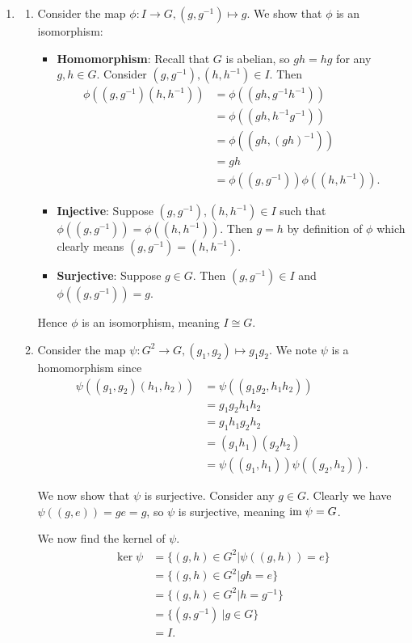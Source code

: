 \begin{enumerate}
    \item \begin{enumerate}[label=(\roman*)]
        \item Consider the map $\phi: I \to G, (g, g^{-1}) \mapsto g$. We show that $\phi$ is an isomorphism:
        \begin{itemize}
            \item \textbf{Homomorphism}: Recall that $G$ is abelian, so $gh = hg$ for any $g, h \in G$. Consider $(g, g^{-1}), (h, h^{-1}) \in I$. Then
            \begin{align*}
                \phi((g, g^{-1})(h, h^{-1})) &= \phi((gh, g^{-1}h^{-1}))\\
                &= \phi((gh, h^{-1}g^{-1}))\\
                &= \phi((gh, (gh)^{-1}))\\
                &= gh\\
                &= \phi((g, g^{-1}))\phi((h, h^{-1})).
            \end{align*}
            \item \textbf{Injective}: Suppose $(g, g^{-1}), (h, h^{-1}) \in I$ such that $\phi((g, g^{-1})) = \phi((h, h^{-1}))$. Then $g = h$ by definition of $\phi$ which clearly means $(g, g^{-1}) = (h, h^{-1})$.
            \item \textbf{Surjective}: Suppose $g \in G$. Then $(g, g^{-1}) \in I$ and $\phi((g, g^{-1})) = g$.
        \end{itemize}
        Hence $\phi$ is an isomorphism, meaning $I \cong G$.
        
        \item Consider the map $\psi: G^2 \to G, (g_1, g_2) \mapsto g_1g_2$. We note $\psi$ is a homomorphism since
        \begin{align*}
            \psi((g_1, g_2)(h_1, h_2)) &= \psi((g_1g_2, h_1h_2))\\
            &= g_1g_2h_1h_2\\
            &= g_1h_1g_2h_2\\
            &= (g_1h_1)(g_2h_2)\\
            &= \psi((g_1, h_1))\psi((g_2, h_2)).
        \end{align*}
        
        We now show that $\psi$ is surjective. Consider any $g \in G$. Clearly we have $\psi((g, e)) = ge = g$, so $\psi$ is surjective, meaning $\mathrm{im}\;\psi = G$.
        
        We now find the kernel of $\psi$.
        \begin{align*}
            \ker\psi &= \{(g, h) \in G^2 \vert \psi((g, h)) = e\}\\
            &= \{(g, h) \in G^2 \vert gh = e\}\\
            &= \{(g, h) \in G^2 \vert h = g^{-1}\}\\
            &= \{(g, g^{-1}) \ | g \in G\}\\
            &= I.
        \end{align*}
        

\end{enumerate}
\end{enumerate}
